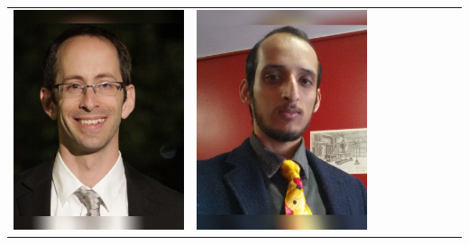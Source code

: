 \documentclass[landscape,a0paper,fontscale=0.292]{baposter}
\begin{document}
\begin{poster}
{\begin{center}
\begin{tabularx}{\linewidth}{X X X X X X X X X}
{\centering \includegraphics[width=0.65\linewidth]{rosman.jpg}}&
{\centering \includegraphics[width=0.65\linewidth]{subedi.jpg}}&

\end{tabularx}
\end{center}}
\end{poster}
\end{document}
